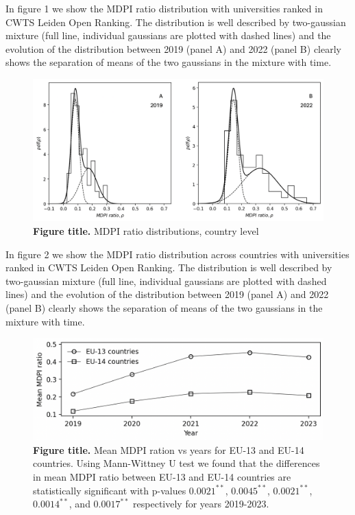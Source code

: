 \documentclass[amsfonts, amssymb, prl, superscriptaddress, notitlepage, twocolumn, nofootinbib]{revtex4-2}
\begin{document}
In figure 1 we show the MDPI ratio distribution with universities ranked in CWTS Leiden Open Ranking. The distribution is well described by two-gaussian mixture (full line, individual gaussians  are plotted with dashed lines) and the evolution of the distribution between 2019 (panel A) and 2022 (panel B) clearly shows the separation of means of the two gaussians in the mixture with time.  

\begin{figure}
    \centering
    \includegraphics[width=1.0\linewidth]{Fig02.png}
    \caption{\label{fig:fig2} {\bf Figure title.} MDPI ratio distributions, country level  
    }
\end{figure}

In figure 2 we show the MDPI ratio distribution across countries with universities ranked in CWTS Leiden Open Ranking. The distribution is well described by two-gaussian mixture (full line, individual gaussians  are plotted with dashed lines) and the evolution of the distribution between 2019 (panel A) and 2022 (panel B) clearly shows the separation of means of the two gaussians in the mixture with time.  

\begin{figure}
    \centering
    \includegraphics[width=1.0\linewidth]{Fig01a.png}
    \caption{\label{fig:fig3} {\bf Figure title.} Mean MDPI ration vs years for EU-13 and EU-14 countries. Using Mann-Wittney U test we found that the differences in mean MDPI ratio between EU-13 and EU-14 countries are statistically significant with p-values $0.0021^{**}$, $0.0045^{**}$, $0.0021^{**}$, $0.0014^{**}$, and $0.0017^{**}$ respectively for years 2019-2023.
}
\end{figure}
\end{document}
